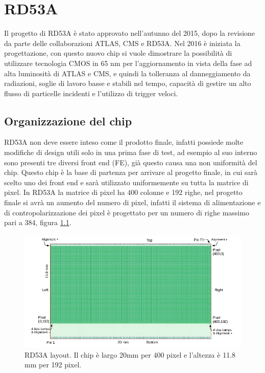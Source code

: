 \chapter{RD53A}

Il progetto di RD53A è stato approvato nell'autunno del 2015, dopo la revisione da parte delle collaborazioni ATLAS, CMS e RD53A. Nel 2016 è iniziata la progettazione, con questo nuovo chip si vuole dimostrare la possibilità di utilizzare tecnologia CMOS  in 65 nm per l'aggiornamento in vista della fase ad alta luminosità di ATLAS e CMS, e quindi la tolleranza al danneggiamento da radiazioni, soglie di lavoro basse e stabili nel tempo, capacità di gestire un alto flusso di particelle incidenti e l'utilizzo di trigger veloci.

\section{Organizzazione del chip} 
RD53A non deve essere inteso come il prodotto finale, infatti possiede molte modifiche di design utili solo in una prima fase di test, ad esempio al suo interno sono presenti tre diversi front end (FE), già questo causa una non uniformità del chip. 
Questo chip è la base di partenza per arrivare al progetto finale, in cui sarà scelto uno dei front end e sarà utilizzato uniformemente su tutta la matrice di pixel. In RD53A la matrice di pixel ha 400 colonne e 192 righe, nel progetto finale si avrà un aumento del numero di pixel, infatti il sistema di alimentazione e di contropolarizzazione dei pixel è progettato per un numero di righe massimo pari a 384, figura \ref{RD53ALayout}.
\begin{figure}
\centering
\includegraphics[scale=.4]{Immagini/RD53ALayout}
\caption{RD53A layout. Il chip è largo 20mm per 400 pixel e l'altezza è 11.8 mm per 192 pixel.}
\label{RD53ALayout}
\end{figure}


